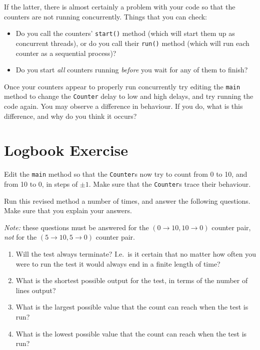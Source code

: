 \documentclass{article}
\begin{document}
If the latter, there is almost certainly a problem with your code so that the counters
are not running concurrently.  Things that you can check:
\begin{itemize}
\item Do you call the counters' {\tt start()} method (which will start them
up as concurrent threads), or do you call their {\tt run()} method
(which will run each counter as a sequential process)?
\item Do you start {\em all} counters running {\em before} you wait for
any of them to finish?
\end{itemize}


Once your counters appear to properly run concurrently try editing the {\tt main} method to change
the {\tt Counter} delay to low and high delays, and try running the code
again. 
You 
may observe a difference in behaviour.  If you do, what is this difference, and why
do you think it occurs?
{\section{Logbook Exercise}}
Edit the {\tt main} method so that the {\tt Counter}s now try to count
from 0 to 10, and from 10 to 0, in steps of $\pm 1$.
Make sure that the {\tt Counter}s trace their behaviour.

Run this revised method a number of times, and
answer the following questions.  Make sure that you explain your answers.

 
{\em Note:} these questions must be answered for the $(0\rightarrow 10,10\rightarrow 0)$ counter pair, {\em not} for the $(5\rightarrow 10,5\rightarrow 0)$
counter pair.
\begin{enumerate}
\item Will the test always terminate?  I.e.\ is it certain that no matter
how often you were to run the test it would always end in a finite length of
time?
\item What is the shortest possible output for the test, in terms of the
number of lines output?
\item What is the largest possible value that the count can reach when the
test is run?
\item What is the lowest possible value that the count can reach when the
test is run?
\end{enumerate}
\end{document}

